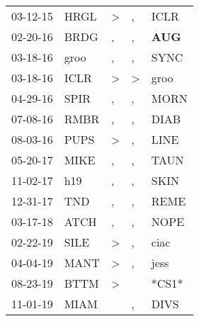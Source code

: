 \begin{supertabular}{p{0.07\textwidth}p{0.06\textwidth}p{0.02\textwidth}p{0.02\textwidth}p{0.06\textwidth}}
          03-12-15\textsuperscript{} &           HRGL\textsuperscript{} &     \textgreater &             , &           ICLR\textsuperscript{} \\
          02-20-16\textsuperscript{} &           BRDG\textsuperscript{} &                , &             , &   \textbf{AUG\textsuperscript{}} \\
          03-18-16\textsuperscript{} &           groo\textsuperscript{} &                , &             , &           SYNC\textsuperscript{} \\
          03-18-16\textsuperscript{} &           ICLR\textsuperscript{} &     \textgreater &  \textgreater &           groo\textsuperscript{} \\
          04-29-16\textsuperscript{} &           SPIR\textsuperscript{} &                , &             , &           MORN\textsuperscript{} \\
          07-08-16\textsuperscript{} &           RMBR\textsuperscript{} &                , &             , &           DIAB\textsuperscript{} \\
          08-03-16\textsuperscript{} &           PUPS\textsuperscript{} &     \textgreater &             , &           LINE\textsuperscript{} \\
          05-20-17\textsuperscript{} &           MIKE\textsuperscript{} &                , &             , &           TAUN\textsuperscript{} \\
          11-02-17\textsuperscript{} &            h19\textsuperscript{} &                , &             , &           SKIN\textsuperscript{} \\
          12-31-17\textsuperscript{} &            TND\textsuperscript{} &                , &             , &           REME\textsuperscript{} \\
          03-17-18\textsuperscript{} &           ATCH\textsuperscript{} &                , &             , &           NOPE\textsuperscript{} \\
          02-22-19\textsuperscript{} &           SILE\textsuperscript{} &     \textgreater &             , &           ciac\textsuperscript{} \\
          04-04-19\textsuperscript{} &           MANT\textsuperscript{} &     \textgreater &             , &           jess\textsuperscript{} \\
          08-23-19\textsuperscript{} &           BTTM\textsuperscript{} &     \textgreater &               &                            *CS1* \\
          11-01-19\textsuperscript{} &           MIAM\textsuperscript{} &                  &             , &           DIVS\textsuperscript{} \\

\end{supertabular}

